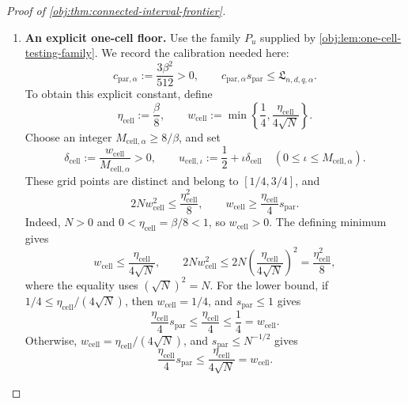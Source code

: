 \begin{proof}[Proof of \cref{obj:thm:connected-interval-frontier}]
\begin{enumerate}
To express the separation in terms of \(d\), split according to the
minimum defining \(J\). If
\(d-1\le\lfloor(2b_0)^{-1}\rfloor\), then \(J=d-1\), and
\(J\ge D_{\mathrm{act},\alpha}\ge1\) implies \(d\ge2\) and
\(J\ge d/2\). Otherwise,
\(J=\lfloor(2b_0)^{-1}\rfloor\), and
\[
Jb_0\ge\frac12-b_0\ge\frac14.
\]
In both cases,
\[
Jb_0\ge\min\left\{\frac{db_0}{2},\frac14\right\}.
\]
Since \(\eta\le1/2\), the two inequalities
\[
\frac{\eta}{24}s_{\mathrm{many}}
\le\frac{db_0}{24},
\qquad
\frac{\eta}{24}s_{\mathrm{many}}
\le\frac1{48}
\]
give
\[
\frac{\eta}{24}s_{\mathrm{many}}
\le
\frac1{12}\min\left\{\frac{db_0}{2},\frac14\right\}
\le\frac{Jb_0}{12}
\le\Delta_{\mathrm{act}}.
\]
Consequently,
\[
c_{\mathrm{act},\alpha}s_{\mathrm{many}}
\le\mathfrak L_{n,d,q,\alpha}
\qquad
(N\ge T_{\mathrm{act},\alpha},\ J\ge D_{\mathrm{act},\alpha}).
\]

\item \textbf{An explicit one-cell floor.}
Use the family \(P_u\) supplied by
\cref{obj:lem:one-cell-testing-family}. We record the calibration needed
here:
\[
c_{\mathrm{par},\alpha}:=\frac{3\beta^2}{512}>0,
\qquad
c_{\mathrm{par},\alpha}s_{\mathrm{par}}
\le\mathfrak L_{n,d,q,\alpha}.
\]
To obtain this explicit constant, define
\[
\eta_{\mathrm{cell}}:=\frac\beta8,\qquad
w_{\mathrm{cell}}
:=\min\left\{\frac14,\frac{\eta_{\mathrm{cell}}}{4\sqrt N}\right\}.
\]
Choose an integer \(M_{\mathrm{cell},\alpha}\ge8/\beta\), and set
\[
\delta_{\mathrm{cell}}
:=\frac{w_{\mathrm{cell}}}{M_{\mathrm{cell},\alpha}}>0,
\qquad
u_{\mathrm{cell},\iota}
:=\frac12+\iota\delta_{\mathrm{cell}}
\quad(0\le\iota\le M_{\mathrm{cell},\alpha}).
\]
These grid points are distinct and belong to \([1/4,3/4]\), and
\[
2Nw_{\mathrm{cell}}^2\le\frac{\eta_{\mathrm{cell}}^2}{8},
\qquad
w_{\mathrm{cell}}\ge
\frac{\eta_{\mathrm{cell}}}{4}s_{\mathrm{par}}.
\]
Indeed, \(N>0\) and \(0<\eta_{\mathrm{cell}}=\beta/8<1\), so
\(w_{\mathrm{cell}}>0\). The defining minimum gives
\[
w_{\mathrm{cell}}\le\frac{\eta_{\mathrm{cell}}}{4\sqrt N},
\qquad
2Nw_{\mathrm{cell}}^2
\le 2N\left(\frac{\eta_{\mathrm{cell}}}{4\sqrt N}\right)^2
=\frac{\eta_{\mathrm{cell}}^2}{8},
\]
where the equality uses \((\sqrt N)^2=N\). For the lower bound, if
\(1/4\le\eta_{\mathrm{cell}}/(4\sqrt N)\), then
\(w_{\mathrm{cell}}=1/4\), and \(s_{\mathrm{par}}\le1\) gives
\[
\frac{\eta_{\mathrm{cell}}}{4}s_{\mathrm{par}}
\le\frac{\eta_{\mathrm{cell}}}{4}
\le\frac14=w_{\mathrm{cell}}.
\]
Otherwise, \(w_{\mathrm{cell}}=\eta_{\mathrm{cell}}/(4\sqrt N)\),
and \(s_{\mathrm{par}}\le N^{-1/2}\) gives
\[
\frac{\eta_{\mathrm{cell}}}{4}s_{\mathrm{par}}
\le\frac{\eta_{\mathrm{cell}}}{4\sqrt N}
=w_{\mathrm{cell}}.
\]


\end{enumerate}
\end{proof}
